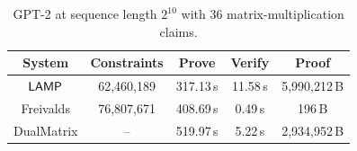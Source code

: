 \begin{table}[H]
\centering
\ifshowrevisions
\fi
\setlength{\tabcolsep}{3pt}
\begin{tabular*}{\columnwidth}{@{\extracolsep{\fill}}ccccc@{}}
\toprule
\textbf{System} & \textbf{Constraints} & \textbf{Prove} & \textbf{Verify} & \textbf{Proof} \\
\midrule
\(\textsf{LAMP}\) & 62{,}460{,}189 & 317.13\,s & 11.58\,s & 5{,}990{,}212\,B \\
Freivalds & 76{,}807{,}671 & 408.69\,s & 0.49\,s & 196\,B \\
DualMatrix & -- & 519.97\,s & 5.22\,s & 2{,}934{,}952\,B \\
\bottomrule
\end{tabular*}
\vspace{6pt}
\caption{GPT-2 at sequence length \(2^{10}\) with 36 matrix-multiplication
claims.}
\label{tab:lamp-gpt2}
\end{table}
